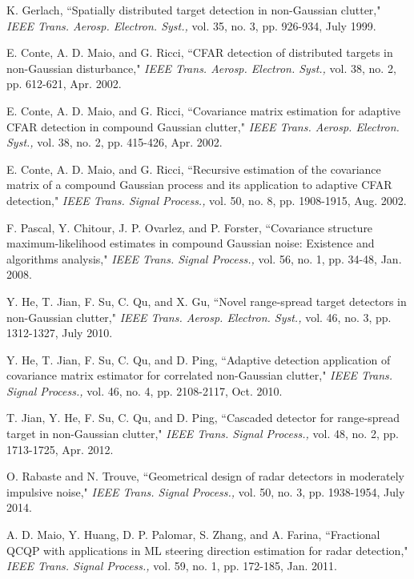 \begin{thebibliography}{12}
K. Gerlach, ``Spatially distributed target detection in non-Gaussian clutter," \emph{IEEE Trans. Aerosp. Electron. Syst.,} vol. 35, no. 3, pp. 926-934, July 1999.


E. Conte, A. D. Maio, and G. Ricci, ``CFAR detection of distributed targets in non-Gaussian disturbance," \emph{IEEE Trans. Aerosp. Electron. Syst.,} vol. 38, no. 2, pp. 612-621, Apr. 2002.

E. Conte, A. D. Maio, and G. Ricci, ``Covariance matrix estimation for adaptive CFAR detection in compound Gaussian clutter," \emph{IEEE Trans. Aerosp. Electron. Syst.,} vol. 38, no. 2, pp. 415-426, Apr. 2002.

E. Conte, A. D. Maio, and G. Ricci, ``Recursive estimation of the covariance matrix of a compound Gaussian process and its
application to adaptive CFAR detection," \emph{IEEE Trans. Signal Process.,} vol. 50, no. 8, pp. 1908-1915, Aug. 2002.

F. Pascal, Y. Chitour, J. P. Ovarlez, and P. Forster, ``Covariance structure maximum-likelihood estimates
in compound Gaussian noise: Existence and algorithms analysis," \emph{IEEE Trans. Signal Process.,} vol. 56, no. 1, pp. 34-48, Jan. 2008.

Y. He, T. Jian, F. Su, C. Qu, and X. Gu, ``Novel range-spread target detectors in non-Gaussian clutter,"
\emph{IEEE Trans. Aerosp. Electron. Syst.,} vol. 46, no. 3, pp. 1312-1327, July 2010.

 Y. He, T. Jian, F. Su, C. Qu, and D. Ping, ``Adaptive detection application of covariance matrix estimator for correlated non-Gaussian clutter,"
 \emph{IEEE Trans. Signal Process.,} vol. 46, no. 4, pp. 2108-2117, Oct. 2010.

T. Jian, Y. He, F. Su, C. Qu, and D. Ping, ``Cascaded detector for range-spread target in non-Gaussian clutter,"
 \emph{IEEE Trans. Signal Process.,} vol. 48, no. 2, pp. 1713-1725, Apr. 2012.

O. Rabaste and N. Trouve, ``Geometrical design of radar detectors in moderately impulsive noise,"
 \emph{IEEE Trans. Signal Process.,} vol. 50, no. 3, pp. 1938-1954, July 2014.

 A. D. Maio, Y. Huang, D. P. Palomar, S. Zhang, and A. Farina, ``Fractional QCQP with applications in ML steering direction estimation for radar detection," \emph{IEEE Trans. Signal Process.,} vol. 59,
no. 1, pp. 172-185, Jan. 2011.


\end{thebibliography}

